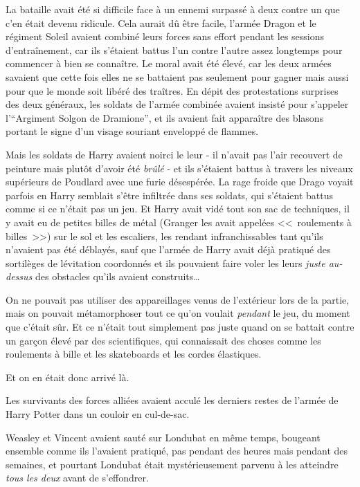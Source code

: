 La bataille avait été si difficile face à un ennemi surpassé à deux contre un que c'en était devenu ridicule. Cela aurait dû être facile, l'armée Dragon et le régiment Soleil avaient combiné leurs forces sans effort pendant les sessions d'entraînement, car ils s'étaient battus l'un contre l'autre assez longtemps pour commencer à bien se connaître. Le moral avait été élevé, car les deux armées savaient que cette fois elles ne se battaient pas seulement pour gagner mais aussi pour que le monde soit libéré des traîtres. En dépit des protestations surprises des deux généraux, les soldats de l'armée combinée avaient insisté pour s'appeler l'“Argiment Solgon de Dramione”, et ils avaient fait apparaître des blasons portant le signe d'un visage souriant enveloppé de flammes.

Mais les soldats de Harry avaient noirci le leur - il n'avait pas l'air recouvert de peinture mais plutôt d'avoir été \emph{brûlé} - et ils s'étaient battus à travers les niveaux supérieurs de Poudlard avec une furie désespérée. La rage froide que Drago voyait parfois en Harry semblait s'être infiltrée dans ses soldats, qui s'étaient battus comme si ce n'était pas un jeu. Et Harry avait vidé tout son sac de techniques, il y avait eu de petites billes de métal (Granger les avait appelées <<~roulements à billes~>>) sur le sol et les escaliers, les rendant infranchissables tant qu'ils n'avaient pas été déblayés, sauf que l'armée de Harry avait déjà pratiqué des sortilèges de lévitation coordonnés et ils pouvaient faire voler les leurs \emph{juste au-dessus} des obstacles qu'ils avaient construits…

On ne pouvait pas utiliser des appareillages venus de l'extérieur lors de la partie, mais on pouvait métamorphoser tout ce qu'on voulait \emph{pendant} le jeu, du moment que c'était sûr. Et ce n'était tout simplement pas juste quand on se battait contre un garçon élevé par des scientifiques, qui connaissait des choses comme les roulements à bille et les skateboards et les cordes élastiques.

Et on en était donc arrivé là.

Les survivants des forces alliées avaient acculé les derniers restes de l'armée de Harry Potter dans un couloir en cul-de-sac.

Weasley et Vincent avaient sauté sur Londubat en même temps, bougeant ensemble comme ils l'avaient pratiqué, pas pendant des heures mais pendant des semaines, et pourtant Londubat était mystérieusement parvenu à les atteindre \emph{tous les deux} avant de s'effondrer.

